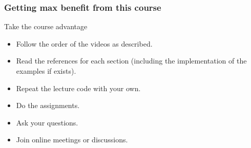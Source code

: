 \begin{frame}
\frametitle{Getting max benefit from this course}
\begin{block}{Take the course advantage}
	\begin{itemize}[<+->]
		\item Follow the order of the videos as described.
		\item Read the references for each section (including the implementation of the examples if exists). 
		\item Repeat the lecture code with your own.  
		\item Do the assignments.
		\item Ask your questions. 
		\item Join online meetings or discussions. 
	\end{itemize}
\end{block}

\end{frame}

